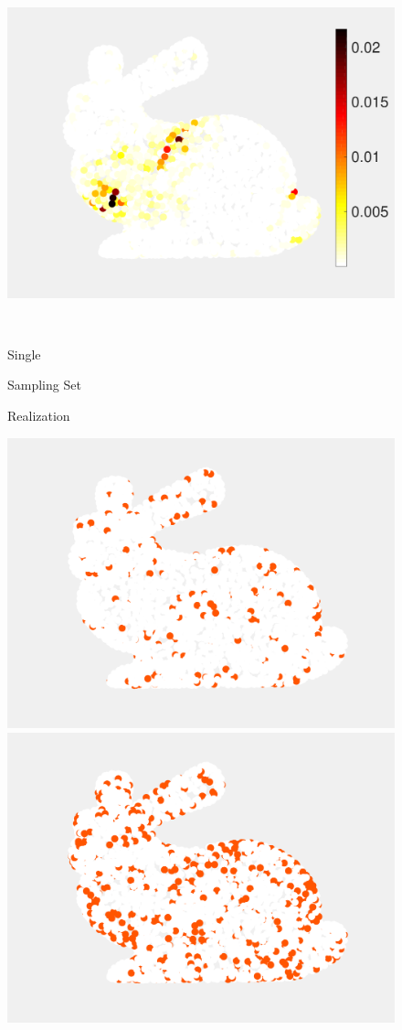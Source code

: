 \documentclass[journal, 10pt]{IEEEtran}
\begin{document}
\begin{figure}[H]
\begin{minipage}[m]{0.4\linewidth}
\end{minipage}
\begin{minipage}[m]{0.4\linewidth}
\centerline{\includegraphics[width=.85\linewidth]{fig_rec_band_weights_adapted}}
\end{minipage} \\
\begin{minipage}[m]{0.16\linewidth}
\centerline{\small{Single}}
\centerline{\small{Sampling Set}}
\centerline{\small{Realization}}
\end{minipage}
\begin{minipage}[m]{0.4\linewidth}
\centerline{\includegraphics[width=.85\linewidth]{fig_rec_low_selected}}
\end{minipage}
\begin{minipage}[m]{0.4\linewidth}
\centerline{\includegraphics[width=.85\linewidth]{fig_rec_band_selected}}

\end{minipage}
\end{figure}
\end{document}
